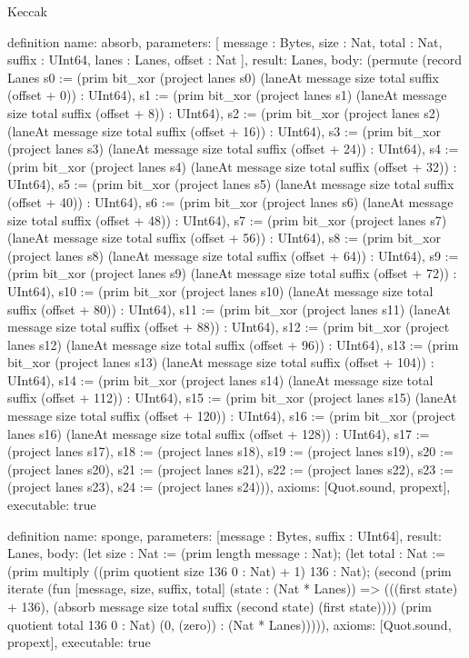 \begin{lexlean}{Keccak}
\begin{semanticmodule}
definition{
  name: absorb,
  parameters: [
    message : Bytes,
    size : Nat,
    total : Nat,
    suffix : UInt64,
    lanes : Lanes,
    offset : Nat
  ],
  result: Lanes,
  body: (permute (record Lanes {s0 := (prim bit_xor (project lanes s0) (laneAt message size total suffix (offset + 0)) : UInt64), s1 := (prim bit_xor (project lanes s1) (laneAt message size total suffix (offset + 8)) : UInt64), s2 := (prim bit_xor (project lanes s2) (laneAt message size total suffix (offset + 16)) : UInt64), s3 := (prim bit_xor (project lanes s3) (laneAt message size total suffix (offset + 24)) : UInt64), s4 := (prim bit_xor (project lanes s4) (laneAt message size total suffix (offset + 32)) : UInt64), s5 := (prim bit_xor (project lanes s5) (laneAt message size total suffix (offset + 40)) : UInt64), s6 := (prim bit_xor (project lanes s6) (laneAt message size total suffix (offset + 48)) : UInt64), s7 := (prim bit_xor (project lanes s7) (laneAt message size total suffix (offset + 56)) : UInt64), s8 := (prim bit_xor (project lanes s8) (laneAt message size total suffix (offset + 64)) : UInt64), s9 := (prim bit_xor (project lanes s9) (laneAt message size total suffix (offset + 72)) : UInt64), s10 := (prim bit_xor (project lanes s10) (laneAt message size total suffix (offset + 80)) : UInt64), s11 := (prim bit_xor (project lanes s11) (laneAt message size total suffix (offset + 88)) : UInt64), s12 := (prim bit_xor (project lanes s12) (laneAt message size total suffix (offset + 96)) : UInt64), s13 := (prim bit_xor (project lanes s13) (laneAt message size total suffix (offset + 104)) : UInt64), s14 := (prim bit_xor (project lanes s14) (laneAt message size total suffix (offset + 112)) : UInt64), s15 := (prim bit_xor (project lanes s15) (laneAt message size total suffix (offset + 120)) : UInt64), s16 := (prim bit_xor (project lanes s16) (laneAt message size total suffix (offset + 128)) : UInt64), s17 := (project lanes s17), s18 := (project lanes s18), s19 := (project lanes s19), s20 := (project lanes s20), s21 := (project lanes s21), s22 := (project lanes s22), s23 := (project lanes s23), s24 := (project lanes s24)})),
  axioms: [Quot.sound, propext],
  executable: true
}

definition{
  name: sponge,
  parameters: [message : Bytes, suffix : UInt64],
  result: Lanes,
  body: (let size : Nat := (prim length message : Nat); (let total : Nat := (prim multiply ((prim quotient size 136 0 : Nat) + 1) 136 : Nat); (second (prim iterate (fun [message, size, suffix, total] (state : (Nat * Lanes)) => (((first state) + 136), (absorb message size total suffix (second state) (first state)))) (prim quotient total 136 0 : Nat) (0, (zero)) : (Nat * Lanes))))),
  axioms: [Quot.sound, propext],
  executable: true
}


\end{semanticmodule}
\end{lexlean}
